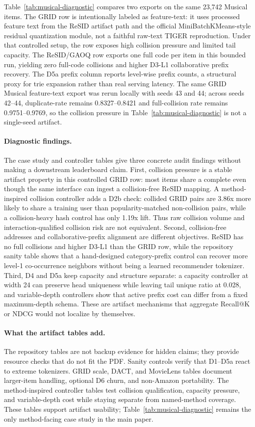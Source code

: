 Table~\ref{tab:musical-diagnostic} compares two exports on the same 23,742
Musical items. The GRID row is intentionally labeled as feature-text: it uses
processed feature text from the ReSID artifact path and the official
MiniBatchKMeans-style residual quantization module, not a faithful raw-text
TIGER reproduction. Under that controlled setup, the row exposes high collision
pressure and limited tail capacity. The ReSID/GAOQ row exports one full code
per item in this bounded run, yielding zero full-code collisions and higher
D3-L1 collaborative prefix recovery. The D5a prefix column reports level-wise
prefix counts, a structural proxy for trie expansion rather than real serving
latency.
The same GRID Musical feature-text export was rerun locally with seeds 43 and
44; across seeds 42--44, duplicate-\sid rate remains 0.8327--0.8421 and
full-collision rate remains 0.9751--0.9769, so the collision pressure in
Table~\ref{tab:musical-diagnostic} is not a single-seed artifact.

\paragraph{Diagnostic findings.}
The case study and controller tables give three concrete audit findings without
making a downstream leaderboard claim. First, collision pressure is a stable
artifact property in this controlled GRID row: most items share a complete
\sid{} even though the same interface can ingest a collision-free ReSID
mapping. A method-inspired collision controller adds a D2b check: collided
GRID pairs are 3.86x more likely to share a training user than
popularity-matched non-collision pairs, while a collision-heavy hash control
has only 1.19x lift. Thus raw collision volume and interaction-qualified
collision risk are not equivalent. Second, collision-free addresses and
collaborative-prefix alignment are different objectives. ReSID has no full
collisions and higher D3-L1 than the GRID row, while the repository sanity
table shows that a hand-designed category-prefix control can recover more
level-1 co-occurrence neighbors without being a learned recommender tokenizer.
Third, D4 and D5a keep capacity and structure separate: a capacity controller
at width 24 can preserve head uniqueness while leaving tail unique ratio at
0.028, and variable-depth controllers show that active prefix cost can differ
from a fixed maximum-depth schema. These are artifact mechanisms that aggregate
Recall@K or NDCG would not localize by themselves.

\paragraph{What the artifact tables add.}
The repository tables are not backup evidence for hidden claims; they provide
resource checks that do not fit the PDF. Sanity controls verify that D1--D5a
react to extreme tokenizers. GRID scale, DACT, and MovieLens tables document
larger-item handling, optional D6 churn, and non-Amazon portability. The
method-inspired controller tables test collision qualification, capacity
pressure, and variable-depth cost while staying separate from named-method
coverage. These tables support artifact usability; Table~\ref{tab:musical-diagnostic}
remains the only method-facing case study in the main paper.
